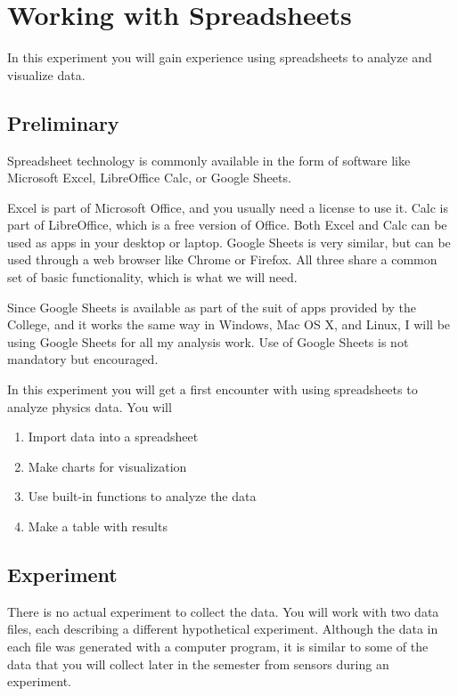 \chapter{Working with Spreadsheets}
In this experiment you will gain experience using spreadsheets to analyze and visualize data.
\section{Preliminary}
Spreadsheet technology is commonly available in the form of software like Microsoft Excel, LibreOffice Calc, or Google Sheets.

Excel is part of Microsoft Office, and you usually need a license to use it. Calc is part of LibreOffice, which is a free version of Office. Both Excel and Calc can be used as apps in your desktop or laptop. Google Sheets is very similar, but can be used through a web browser like Chrome or Firefox. All three share a common set of basic functionality, which is what we will need.

Since Google Sheets is available as part of the suit of apps provided by the College, and it works the same way in Windows, Mac OS X, and Linux, I will be using Google Sheets for all my analysis work. Use of Google Sheets is not mandatory but encouraged.

In this experiment you will get a first encounter with using spreadsheets to analyze physics data. You will
\begin{enumerate}
    \item Import data into a spreadsheet
    \item Make charts for visualization
    \item Use built-in functions to analyze the data
    \item Make a table with results
\end{enumerate}
\section{Experiment}
There is no actual experiment to collect the data. You will work with two data files, each describing a different hypothetical experiment. Although the data in each file was generated with a computer program, it is similar to some of the data that you will collect later in the semester from sensors during an experiment.
